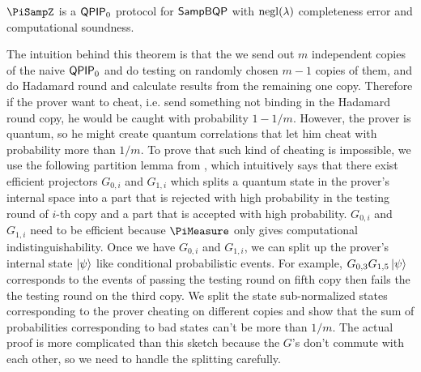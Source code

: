 \begin{theorem}\label{thm:qpip0}
	$\PiSampZ$ is a $\operatorname{\mathsf{QPIP}}_0$ protocol for $\operatorname{\mathsf{SampBQP}}$ with $\operatorname{negl}(\lambda)$ completeness error and computational soundness. 
\end{theorem}


The intuition behind this theorem is that the we send out $m$ independent copies of the naive $\operatorname{\mathsf{QPIP}}_0$ and do testing on randomly chosen $m-1$ copies of them, and do Hadamard round and calculate results from the remaining one copy. Therefore if the prover want to cheat, i.e. send something not binding in the Hadamard round copy, he would be caught with probability $1-1/m$. However, the prover is quantum, so he might create quantum correlations that let him cheat with probability more than $1/m$. To prove that such kind of cheating is impossible, we use the following partition lemma from \cite{parallelrep}, which intuitively says that there exist efficient projectors $G_{0,i}$ and $G_{1,i}$ which splits a quantum state in the prover's   internal space into a part that is rejected with high probability in the testing round of $i$-th copy and a part that is accepted with high probability.  $G_{0,i}$ and $G_{1,i}$ need to be efficient because $\PiMeasure$ only gives computational indistinguishability. Once we have $G_{0,i}$ and $G_{1,i}$, we can split up the prover's internal state $\ket{\psi}$ like conditional probabilistic events. For example, $G_{0,3} G_{1,5} \ket{\psi}$ corresponds to the events of passing the testing round on fifth copy then fails the the testing round on the third copy. We split the state sub-normalized states corresponding to the prover cheating on different copies and show that the sum of probabilities corresponding to bad states can't be more than $1/m$. {The actual proof is more complicated than this sketch because the $G$'s don't commute with each other, so we need to handle the splitting carefully.}

